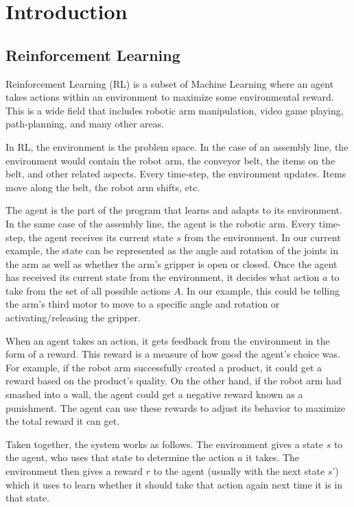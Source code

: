 \documentclass[12pt]{thesis}
\begin{document}
\body


\chapter{Introduction}
\section{Reinforcement Learning}
Reinforcement Learning (RL) is a subset of Machine Learning where an agent takes actions within an environment to maximize some environmental reward. \cite{Sutton1998} This is a wide field that includes robotic arm manipulation, video game playing, path-planning, and many other areas.

In RL, the environment is the problem space. In the case of an assembly line, the environment would contain the robot arm, the conveyor belt, the items on the belt, and other related aspects. Every time-step, the environment updates. Items move along the belt, the robot arm shifts, etc.

The agent is the part of the program that learns and adapts to its environment. In the same case of the assembly line, the agent is the robotic arm. Every time-step, the agent receives its current state $s$ from the environment. In our current example, the state can be represented as the angle and rotation of the joints in the arm as well as whether the arm’s gripper is open or closed. Once the agent has received its current state from the environment, it decides what action $a$ to take from the set of all possible actions $A$. In our example, this could be telling the arm’s third motor to move to a specific angle and rotation or activating/releasing the gripper.

When an agent takes an action, it gets feedback from the environment in the form of a reward. This reward is a measure of how good the agent’s choice was. For example, if the robot arm successfully created a product, it could get a reward based on the product’s quality. On the other hand, if the robot arm had smashed into a wall, the agent could get a negative reward known as a punishment. The agent can use these rewards to adjust its behavior to maximize the total reward it can get.

Taken together, the system works as follows. The environment gives a state $s$ to the agent, who uses that state to determine the action $a$ it takes. The environment then gives a reward $r$ to the agent (usually with the next state $s’$) which it uses to learn whether it should take that action again next time it is in that state.
\end{document}
